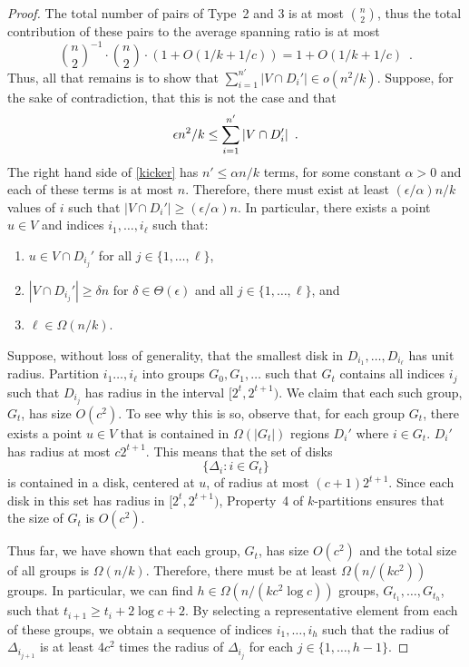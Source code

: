 \documentclass{patmorin}
\begin{document}
\begin{proof}
  The total number of pairs of Type~2 and 3 is at most $\binom{n}{2}$,
  thus the total contribution of these pairs to the average spanning ratio
  is at most
  \[
    \binom{n}{2}^{-1}\cdot\binom{n}{2}\cdot(1+O(1/k+1/c)) = 1+O(1/k+1/c) \enspace .
  \]
  Thus, all that remains is to show that $\sum_{i=1}^{n'}|V\cap D_i'|
  \in o(n^2/k)$.  Suppose, for the sake of contradiction,
  that this is not the case and that
  \begin{equation}
    \epsilon n^2/k \le \sum_{i=1}^{n'} |V\cap D_i'| 
         \enspace . \eqlabel{kicker}
  \end{equation}
  The right hand side of \eqref{kicker} has $n'\le \alpha n/k$
  terms, for some constant $\alpha >0$ and each of these terms
  is at most $n$.  Therefore, there must exist at least
  $(\epsilon/\alpha)n/k$ values of $i$ such that $|V\cap D_i'|\ge
  (\epsilon/\alpha)n$.  In particular, there exists a point $u\in V$
  and indices $i_1,\ldots,i_\ell$ such that:
  \begin{enumerate}
     \item $u\in V\cap D_{i_j}'$ for all $j\in\{1,\ldots,\ell\}$,
     \item $|V\cap D_{i_j}'|\ge \delta n$ for $\delta\in\Theta(\epsilon)$
       and all $j\in\{1,\ldots,\ell\}$, and
     \item $\ell\in\Omega(n/k)$.
  \end{enumerate}

  Suppose, without loss of generality, that the smallest disk
  in $D_{i_1},\ldots,D_{i_\ell}$ has unit radius.  Partition
  $i_1\ldots,i_\ell$ into groups $G_0,G_1,\ldots$ such that $G_t$
  contains all indices $i_j$ such that $D_{i_j}$ has radius in the
  interval $[2^t,2^{t+1})$.
  We claim that each such group, $G_t$, has size $O(c^2)$.  To see
  why this is so, observe that, for each group $G_t$, there exists a
  point $u\in V$ that is contained in $\Omega(|G_t|)$ regions $D_{i}'$
  where $i\in G_t$.  $D_{i}'$ has radius at most $c2^{t+1}$.  This means
  that the set of disks
  \[
     \{ \Delta_i : i\in G_t\}
  \]
  is contained in a disk, centered at $u$, of radius at most
  $(c+1)2^{t+1}$.  Since each disk in this set has radius in
  $[2^t,2^{t+1})$, Property~4 of $k$-partitions ensures that the size
  of $G_t$ is $O(c^2)$.

  Thus far, we have shown that each group, $G_t$, has size $O(c^2)$
  and the total size of all groups is $\Omega(n/k)$.
  Therefore, there must be at least $\Omega(n/(kc^2))$ groups.
  In particular, we can find $h\in\Omega(n/(kc^2\log c))$ groups,
  $G_{t_1},\ldots,G_{t_h}$, such that $t_{i+1} \ge
  t_{i}+2\log c+2$.  By selecting a representative element from each
  of these groups, we obtain a sequence of indices $i_1,\ldots,i_h$
  such that the radius of $\Delta_{i_{j+1}}$ is at least $4c^2$ times the
  radius of $\Delta_{i_j}$ for each $j\in\{1,\ldots,h-1\}$.


\end{proof}
\end{document}

